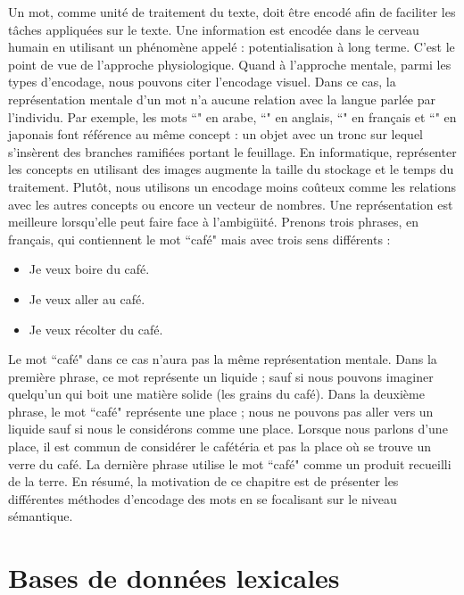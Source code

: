 \documentclass{KodeBook}
\begin{document}
Un mot, comme unité de traitement du texte, doit être encodé afin de faciliter les tâches appliquées sur le texte. 
Une information est encodée dans le cerveau humain en utilisant un phénomène appelé : potentialisation à long terme. 
C'est le point de vue de l'approche physiologique.
Quand à l'approche mentale, parmi les types d'encodage, nous pouvons citer l'encodage visuel. 
Dans ce cas, la représentation mentale d'un mot n'a aucune relation avec la langue parlée par l'individu.
Par exemple, les mots ``" en arabe, ``" en anglais, ``" en français et ``" en japonais font référence au même concept : un objet avec un tronc sur lequel s'insèrent des branches ramifiées portant le feuillage.
En informatique, représenter les concepts en utilisant des images augmente la taille du stockage et le temps du traitement. 
Plutôt, nous utilisons un encodage moins coûteux comme les relations avec les autres concepts ou encore un vecteur de nombres.
Une représentation est meilleure lorsqu'elle peut faire face à l'ambigüité. 
Prenons trois phrases, en français, qui contiennent le mot ``café" mais avec trois sens différents : 
\begin{itemize}
	\item Je veux boire du café.
	\item Je veux aller au café.
	\item Je veux récolter du café.
\end{itemize}
Le mot ``café" dans ce cas n'aura pas la même représentation mentale. 
Dans la première phrase, ce mot représente un liquide ; sauf si nous pouvons imaginer quelqu'un qui boit une matière solide (les grains du café). 
Dans la deuxième phrase, le mot ``café" représente une place ; nous ne pouvons pas aller vers un liquide sauf si nous le considérons comme une place. 
Lorsque nous parlons d'une place, il est commun de considérer le cafétéria et pas la place où se trouve un verre du café.
La dernière phrase utilise le mot ``café" comme un produit recueilli de la terre.
En résumé, la motivation de ce chapitre est de présenter les différentes méthodes d'encodage des mots en se focalisant sur le niveau sémantique.

\section{Bases de données lexicales}
\end{document}
